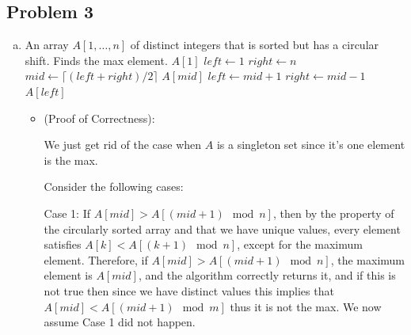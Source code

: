 \documentclass[12pt, letterpaper]{article}
\theoremstyle{definition}
\begin{document}
\newpage
\subsection*{Problem 3}
\begin{enumerate}[(a)]
    \item \begin{algorithm}[H]
        \caption{Max in circular shifted Array}
        \begin{algorithmic}[1]
        \Require An array $A[1,\dots,n]$ of distinct integers that is sorted but has a circular shift.
        \Ensure Finds the max element.
                \State \Return $A[1]$
            \EndIf
            \State $left \gets 1$
            \State $right \gets n$
                \State $mid \gets \lceil (left + right)/2 \rceil$
                 
                    \State \Return $A[mid]$ 
                \EndIf
                 
                    \State $left \gets mid + 1$
                \Else
                    \State $right \gets mid - 1$ 
                \EndIf
            \EndWhile
            \State \Return $A[left]$ 
        \EndFunction
        \end{algorithmic}
        \end{algorithm}

    \begin{itemize}
        \item (Proof of Correctness):
        
        We just get rid of the case when $A$ is a singleton set since it's one element is the max.

        Consider the following cases:
    
        Case 1: If $A[mid] > A[(mid + 1) \mod n]$, then by the property of the circularly sorted array and that we have unique values, every element satisfies $A[k] < A[(k + 1) \mod n]$, except for the maximum element. Therefore, if $A[mid] > A[(mid + 1) \mod n]$, the maximum element is $A[mid]$, and the algorithm correctly returns it, and if this is not true then since we have distinct values this implies that $A[mid] < A[(mid+1) \mod m]$ thus it is not the max. We now assume Case 1 did not happen.


\end{itemize}
\end{enumerate}
\end{document}
